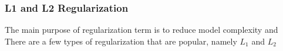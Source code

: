 \subsubsection{L1 and L2 Regularization}

The main purpose of regularization term is to reduce model complexity and There are a few types of regularization that are popular, namely $L_1$ and $L_2$